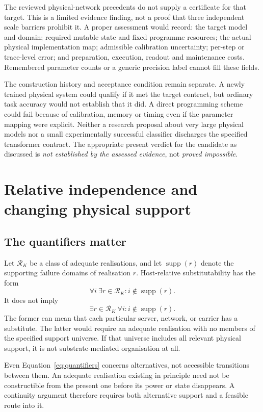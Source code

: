 \documentclass[11pt,a4paper]{article}
\theoremstyle{definition}
\theoremstyle{remark}
\newcommand{\calK}{K}
\DeclareMathOperator{\supp}{supp}
\begin{document}
The reviewed physical-network precedents do not supply a certificate for that target. This is a limited evidence finding, not a proof that three independent scale barriers prohibit it. A proper assessment would record: the target model and domain; required mutable state and fixed programme resources; the actual physical implementation map; admissible calibration uncertainty; per-step or trace-level error; and preparation, execution, readout and maintenance costs. Remembered parameter counts or a generic precision label cannot fill these fields.

The construction history and acceptance condition remain separate. A newly trained physical system could qualify if it met the target contract, but ordinary task accuracy would not establish that it did. A direct programming scheme could fail because of calibration, memory or timing even if the parameter mapping were explicit. Neither a research proposal about very large physical models \citep{pfm} nor a small experimentally successful classifier discharges the specified transformer contract. The appropriate present verdict for the candidate as discussed is \emph{not established by the assessed evidence}, not \emph{proved impossible}.


\section{Relative independence and changing physical support}\label{sec:independence}
\subsection{The quantifiers matter}
Let $\mathscr R_{\calK}$ be a class of adequate realisations, and let $\supp(r)$ denote the supporting failure domains of realisation $r$. Host-relative substitutability has the form
\begin{equation}\label{eq:quantifiers}
 \forall i\ \exists r\in\mathscr R_{\calK}:i\notin\supp(r).
\end{equation}
It does not imply
\[
 \exists r\in\mathscr R_{\calK}\ \forall i:i\notin\supp(r).
\]
The former can mean that each particular server, network, or carrier has a substitute. The latter would require an adequate realisation with no members of the specified support universe. If that universe includes all relevant physical support, it is not substrate-mediated organisation at all.

Even Equation~\eqref{eq:quantifiers} concerns alternatives, not accessible transitions between them. An adequate realisation existing in principle need not be constructible from the present one before its power or state disappears. A continuity argument therefore requires both alternative support and a feasible route into it.
\end{document}
